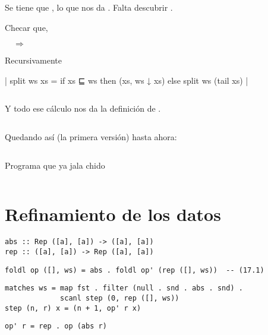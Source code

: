 \inputminted{haskell}{definiciones/kmp/1-split-eq.hs}

Se tiene que , lo que nos da . Falta descubrir .

Checar que,

 $\quad\Longrightarrow\quad$ 

Recursivamente

| split ws xs = if xs ⊑ ws then (xs, ws ↓ xs) else split ws (tail xs) |

 

\inputminted{haskell}{definiciones/kmp/1-op-raz-eq.hs}

Y todo ese cálculo nos da la definición de 
.

\inputminted{haskell}{definiciones/kmp/1-op.hs}

Quedando así (la primera versión) hasta ahora:

\inputminted{haskell}{definiciones/kmp/1-final.hs}

Programa que ya jala chido

\inputminted{haskell}{codigo/haskell/1-first-steps.hs}

\section{Refinamiento de los datos}

\begin{verbatim}
abs :: Rep ([a], [a]) -> ([a], [a])
rep :: ([a], [a]) -> Rep ([a], [a])
\end{verbatim}


\begin{verbatim}
foldl op ([], ws) = abs . foldl op' (rep ([], ws))  -- (17.1)
\end{verbatim}

\begin{verbatim}
matches ws = map fst . filter (null . snd . abs . snd) .
             scanl step (0, rep ([], ws))
step (n, r) x = (n + 1, op' r x)    
\end{verbatim}

\begin{verbatim}
op' r = rep . op (abs r)
\end{verbatim}

